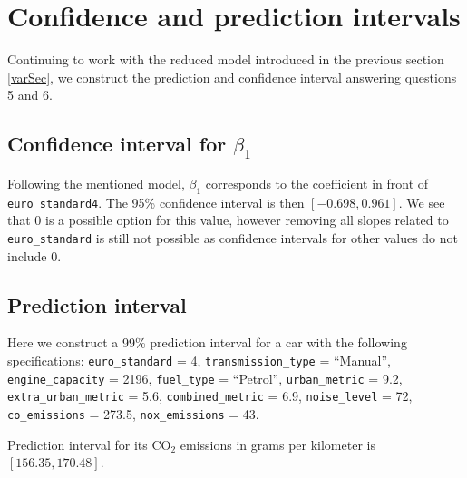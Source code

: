 \documentclass[12pt]{article}
\begin{document}
\section{Confidence and prediction intervals}
Continuing to work with the reduced model introduced in the previous section \ref{varSec}, we construct the prediction and confidence interval
answering questions 5 and 6.

\subsection{Confidence interval for $\beta_1$}
Following the mentioned model, $\beta_1$ corresponds to the coefficient in front of \texttt{euro\_standard4}. The 95\% confidence
interval is then $[-0.698,0.961].$
We see that 0 is a possible option for this value, however removing all slopes related to \texttt{euro\_standard} is still not possible 
as confidence intervals for other values do not include 0.

\subsection{Prediction interval}
Here we construct a 99\% prediction interval for a car with the following specifications: \texttt{euro\_standard} = 4, \texttt{transmission\_type}
= ``Manual'', \texttt{engine\_capacity} = 2196, \texttt{fuel\_type} = ``Petrol'', \texttt{urban\_metric} =
9.2, \texttt{extra\_urban\_metric} = 5.6, \texttt{combined\_metric} = 6.9, \texttt{noise\_level} = 72, \texttt{co\_emissions}
= 273.5, \texttt{nox\_emissions} = 43. 

Prediction interval for its $\text{CO}_2$ emissions in grams per kilometer is $[156.35,170.48].$
\end{document}
